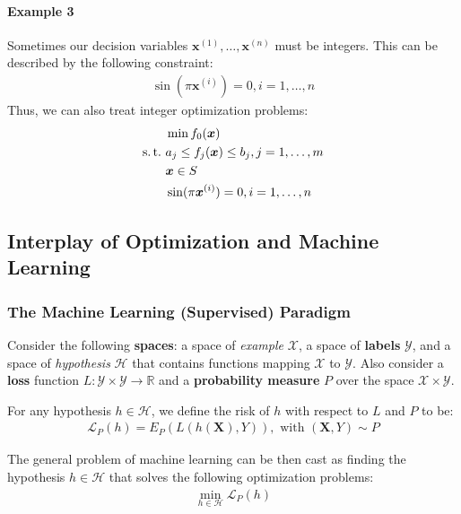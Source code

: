 \paragraph{Example 3} Sometimes our decision variables $\bm x^{(1)},\dots,\bm x^{(n)}$ must be integers. This can be described by the following constraint:
\begin{align*}
    \sin(\pi \bm x^{(i)})=0, i=1,\dots,n
\end{align*}
Thus, we can also treat integer optimization problems:
\begin{align*}
    &\min f_0(\bm x)\\
    \st & a_j \le f_j(\bm x) \le b_j, j=1,\dots,m\\
    &\bm x\in S\\
    &\sin(\pi \bm x^{(i)})=0, i=1,\dots,n
\end{align*}

\subsection{\small Interplay of Optimization and Machine Learning}
\subsubsection{The Machine Learning (Supervised) Paradigm}
Consider the following \textbf{spaces}: a space of \textit{example} $\mathcal{X}$, a space of \textbf{labels} $\mathcal{Y}$, and a space of \textit{hypothesis} $\mathcal{H}$ that contains functions mapping $\mathcal{X}$ to $\mathcal{Y}$. Also consider a \textbf{loss} function $L: \mathcal{Y}\times \mathcal{Y}\to \mathbb{R}$ and a \textbf{probability measure} $P$ over the space $\mathcal{X} \times \mathcal{Y}$. 

\begin{definition}
    For any hypothesis $h\in \mathcal{H}$, we define the risk of $h$ with respect to $L$ and $P$ to be:
    \begin{align*}
        \mathcal{L}_P(h)=E_P(L(h(\bm X), Y)),\text{ with }(\bm X, Y)\sim P
    \end{align*}

    The general problem of machine learning can be then cast as finding the hypothesis $h\in\mathcal{H}$ that  solves the following optimization problems:
    \begin{align*}
        \min_{h\in \mathcal{H}}\mathcal{L}_P (h)
    \end{align*}
\end{definition}

